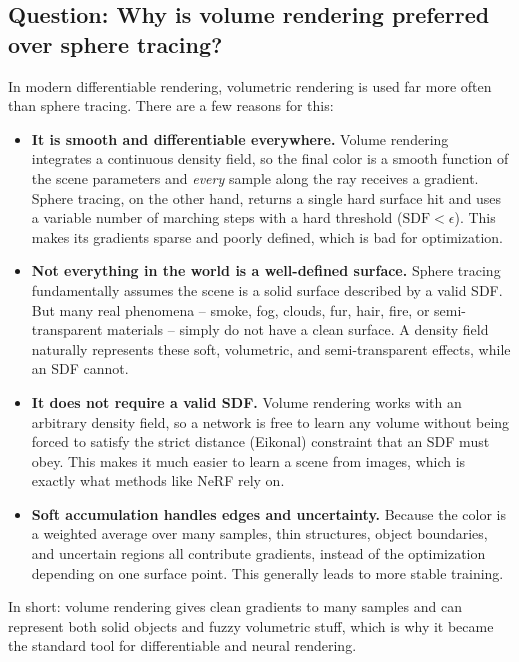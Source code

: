 \documentclass[11pt]{article}
\begin{document}
\subsection{Question: Why is volume rendering preferred over sphere tracing?}

In modern differentiable rendering, volumetric rendering is used far more often than sphere
tracing. There are a few reasons for this:

\begin{itemize}
    \item \textbf{It is smooth and differentiable everywhere.} Volume rendering integrates a
    continuous density field, so the final color is a smooth function of the scene parameters
    and \emph{every} sample along the ray receives a gradient. Sphere tracing, on the other
    hand, returns a single hard surface hit and uses a variable number of marching steps with
    a hard threshold ($\text{SDF} < \epsilon$). This makes its gradients sparse and poorly
    defined, which is bad for optimization.

    \item \textbf{Not everything in the world is a well-defined surface.} Sphere tracing
    fundamentally assumes the scene is a solid surface described by a valid SDF. But many
    real phenomena -- smoke, fog, clouds, fur, hair, fire, or semi-transparent materials --
    simply do not have a clean surface. A density field naturally represents these soft,
    volumetric, and semi-transparent effects, while an SDF cannot.

    \item \textbf{It does not require a valid SDF.} Volume rendering works with an arbitrary
    density field, so a network is free to learn any volume without being forced to satisfy
    the strict distance (Eikonal) constraint that an SDF must obey. This makes it much easier
    to learn a scene from images, which is exactly what methods like NeRF rely on.

    \item \textbf{Soft accumulation handles edges and uncertainty.} Because the color is a
    weighted average over many samples, thin structures, object boundaries, and uncertain
    regions all contribute gradients, instead of the optimization depending on one surface
    point. This generally leads to more stable training.
\end{itemize}

In short: volume rendering gives clean gradients to many samples and can represent both solid
objects and fuzzy volumetric stuff, which is why it became the standard tool for
differentiable and neural rendering.
\end{document}
